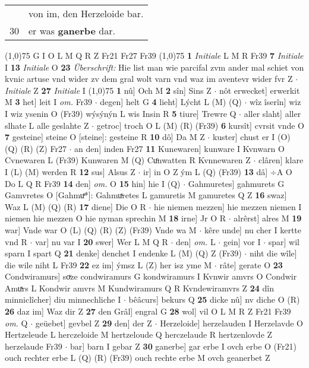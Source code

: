 \documentclass[8pt,a4paper,notitlepage]{article}
\begin{document}
\begin{table}[ht]
\begin{minipage}[t]{0.5\linewidth}
\begin{tabular}{rl}
 & von im, den Herzeloide bar.\\ 
30 & er was \textbf{ganerbe} dar.\\ 
\end{tabular}
\scriptsize
\line(1,0){75} \newline
G I O L M Q R Z Fr21 Fr27 Fr39 \newline
\line(1,0){75} \newline
\textbf{1} \textit{Initiale} L M R Fr39  \textbf{7} \textit{Initiale} I  \textbf{13} \textit{Initiale} O  \textbf{23} \textit{Überschrift:} Hie list man wie parcifal zvm ander mal schiet von kvnic artuse vnd wider zv dem gral wolt varn vnd waz im aventevr wider fvr Z   $\cdot$ \textit{Initiale} Z  \textbf{27} \textit{Initiale} I  \newline
\line(1,0){75} \newline
\textbf{1} nû] Och M \textbf{2} sîn] Sins Z  $\cdot$ nôt erwecket] erwerkit M \textbf{3} het] leit I \textit{om.} Fr39  $\cdot$ degen] helt G \textbf{4} lieht] Lýcht L (M) (Q)  $\cdot$ wîz îserîn] wiz I wiz ysenin O (Fr39) wýsýnýn L wis Insin R \textbf{5} tiure] Trewre Q  $\cdot$ aller slaht] aller slhate L alle geslahte Z  $\cdot$ getroc] troch O L (M) (R) (Fr39) \textbf{6} kursît] cvrsit vnde O \textbf{7} gesteine] steine O [steine]: gesteine R \textbf{10} dô] Da M Z  $\cdot$ kuster] chust er I (O) (Q) (R) (Z) Fr27  $\cdot$ an den] inden Fr27 \textbf{11} Kunewaren] kunware I Kvnwarn O Cvnewaren L (Fr39) Kunwaren M (Q) Cuͦnwatten R Kvnnewaren Z  $\cdot$ clâren] klare I (L) (M) werden R \textbf{12} sus] Alsus Z  $\cdot$ ir] in O Z ým L (Q) (Fr39) \textbf{13} dâ] ÷A O Do L Q R Fr39 \textbf{14} den] \textit{om.} O \textbf{15} hin] hie I (Q)  $\cdot$ Gahmuretes] gahmurets G Gamvretes O [Gahmuͯ*]: Gahmuͯretes L gamuretis M gamuretes Q Z \textbf{16} swaz] Waz L (M) (Q) (R) \textbf{17} diene] Die O R  $\cdot$ hie niemen mezzen] hie mezzen niemen I niemen hie mezzen O hie nyman sprechin M \textbf{18} irne] Jr O R  $\cdot$ alrêrst] alres M \textbf{19} war] Vnde war O (L) (Q) (R) (Z) (Fr39) Vnde wa M  $\cdot$ kêre unde] nu cher I kertte vnd R  $\cdot$ var] nu var I \textbf{20} swer] Wer L M Q R  $\cdot$ den] \textit{om.} L  $\cdot$ gein] vor I  $\cdot$ spar] wil sparn I spart Q \textbf{21} denke] denchet I endenke L (M) (Q) Z (Fr39)  $\cdot$ niht die wîle] die wile niht L Fr39 \textbf{22} ez im] ýmsz L (Z) her isz yme M  $\cdot$ râte] gerate O \textbf{23} Condwiramurs] soͮze condwiramurs G kondwiramurs I Kvnwir amvrs O Condwir Amuͯrs L Kondwir amvrs M Kundwiramurs Q R Kvndewiramvrs Z \textbf{24} dîn minniclîcher] diu minnechliche I  $\cdot$ bêâcurs] bekurs Q \textbf{25} dicke nû] nv diche O (R) \textbf{26} daz im] Waz dir Z \textbf{27} den Grâl] engral G \textbf{28} wol] vil O L M R Z Fr21 Fr39 \textit{om.} Q  $\cdot$ geüebet] gevbel Z \textbf{29} den] der Z  $\cdot$ Herzeloide] herzelauden I Herzelavde O Hertzeleude L herczeloide M hertzeloude Q herczelaude R hertzenlovde Z herzelaude Fr39  $\cdot$ bar] barn I gebar Z \textbf{30} ganerbe] gar erbe I ovch erbe O (Fr21) ouch rechter erbe L (Q) (R) (Fr39) ouch rechte erbe M ovch geanerbet Z \newline

\end{minipage}
\end{table}
\end{document}
